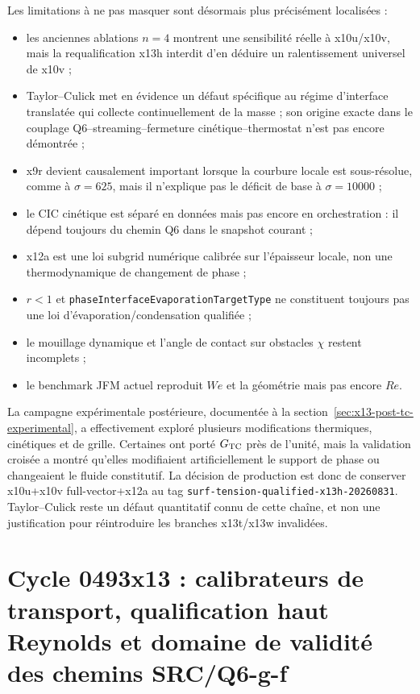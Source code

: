 \documentclass[11pt,a4paper]{article}
\begin{document}
Les limitations à ne pas masquer sont désormais plus précisément localisées :
\begin{itemize}[leftmargin=2em]
  \item les anciennes ablations $n=4$ montrent une sensibilité réelle à x10u/x10v, mais la requalification x13h interdit d'en déduire un ralentissement universel de x10v ;
  \item Taylor--Culick met en évidence un défaut spécifique au régime d'interface translatée qui collecte continuellement de la masse ; son origine exacte dans le couplage Q6--streaming--fermeture cinétique--thermostat n'est pas encore démontrée ;
  \item x9r devient causalement important lorsque la courbure locale est sous-résolue, comme à $\sigma=625$, mais il n'explique pas le déficit de base à $\sigma=10000$ ;
  \item le CIC cinétique est séparé en données mais pas encore en orchestration : il dépend toujours du chemin Q6 dans le snapshot courant ;
  \item x12a est une loi subgrid numérique calibrée sur l'épaisseur locale, non une thermodynamique de changement de phase ;
  \item $r<1$ et \texttt{phaseInterfaceEvaporationTargetType} ne constituent toujours pas une loi d'évaporation/condensation qualifiée ;
  \item le mouillage dynamique et l'angle de contact sur obstacles $\chi$ restent incomplets ;
  \item le benchmark JFM actuel reproduit $We$ et la géométrie mais pas encore $Re$.
\end{itemize}

La campagne expérimentale postérieure, documentée à la section~\ref{sec:x13-post-tc-experimental}, a effectivement exploré plusieurs modifications thermiques, cinétiques et de grille. Certaines ont porté $G_{\rm TC}$ près de l'unité, mais la validation croisée a montré qu'elles modifiaient artificiellement le support de phase ou changeaient le fluide constitutif. La décision de production est donc de conserver x10u+x10v full-vector+x12a au tag \texttt{surf-tension-qualified-x13h-20260831}. Taylor--Culick reste un défaut quantitatif connu de cette chaîne, et non une justification pour réintroduire les branches x13t/x13w invalidées.



\section{Cycle 0493x13 : calibrateurs de transport, qualification haut Reynolds et domaine de validité des chemins SRC/Q6-g-f}
\label{sec:x13-transport}
\end{document}
